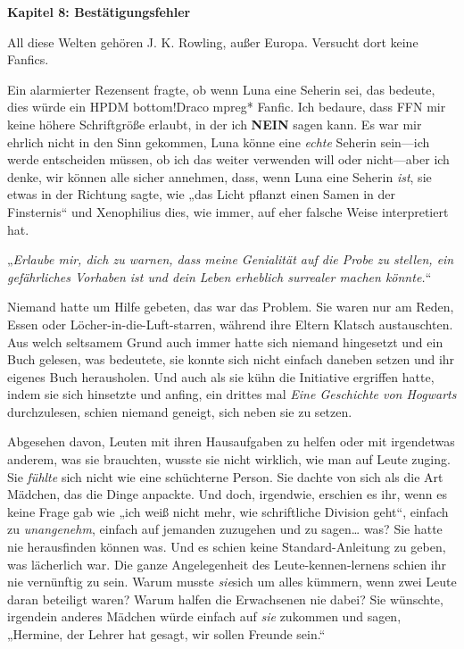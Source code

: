 

\hypertarget{bestuxe4tigungsfehler}{%

\textbf{Kapitel 8: Bestätigungsfehler}

All diese Welten gehören J. K. Rowling, außer Europa. Versucht dort keine Fanfics.

\later

Ein alarmierter Rezensent fragte, ob wenn Luna eine Seherin sei, das bedeute, dies würde ein HPDM bottom!Draco mpreg* Fanfic. Ich bedaure, dass FFN mir keine höhere Schriftgröße erlaubt, in der ich \textbf{NEIN} sagen kann. Es war mir ehrlich nicht in den Sinn gekommen, Luna könne eine \emph{echte} Seherin sein—ich werde entscheiden müssen, ob ich das weiter verwenden will oder nicht—aber ich denke, wir können alle sicher annehmen, dass, wenn Luna eine Seherin \emph{ist}, sie etwas in der Richtung sagte, wie „das Licht pflanzt einen Samen in der Finsternis“ und Xenophilius dies, wie immer, auf eher falsche Weise interpretiert hat.

\later

„\emph{Erlaube mir, dich zu warnen, dass meine Genialität auf die Probe zu stellen, ein gefährliches Vorhaben ist und dein Leben erheblich surrealer machen könnte.}“

\later

Niemand hatte um Hilfe gebeten, das war das Problem. Sie waren nur am Reden, Essen oder Löcher-in-die-Luft-starren, während ihre Eltern Klatsch austauschten. Aus welch seltsamem Grund auch immer hatte sich niemand hingesetzt und ein Buch gelesen, was bedeutete, sie konnte sich nicht einfach daneben setzen und ihr eigenes Buch herausholen. Und auch als sie kühn die Initiative ergriffen hatte, indem sie sich hinsetzte und anfing, ein drittes mal \emph{Eine Geschichte von Hogwarts} durchzulesen, schien niemand geneigt, sich neben sie zu setzen.

Abgesehen davon, Leuten mit ihren Hausaufgaben zu helfen oder mit irgendetwas anderem, was sie brauchten, wusste sie nicht wirklich, wie man auf Leute zuging. Sie \emph{fühlte} sich nicht wie eine schüchterne Person. Sie dachte von sich als die Art Mädchen, das die Dinge anpackte. Und doch, irgendwie, erschien es ihr, wenn es keine Frage gab wie „ich weiß nicht mehr, wie schriftliche Division geht“, einfach zu \emph{unangenehm}, einfach auf jemanden zuzugehen und zu sagen… was? Sie hatte nie herausfinden können was. Und es schien keine Standard-Anleitung zu geben, was lächerlich war. Die ganze Angelegenheit des Leute-kennen-lernens schien ihr nie vernünftig zu sein. Warum musste \emph{sie}sich um alles kümmern, wenn zwei Leute daran beteiligt waren? Warum halfen die Erwachsenen nie dabei? Sie wünschte, irgendein anderes Mädchen würde einfach auf \emph{sie} zukommen und sagen, „Hermine, der Lehrer hat gesagt, wir sollen Freunde sein.“

}

